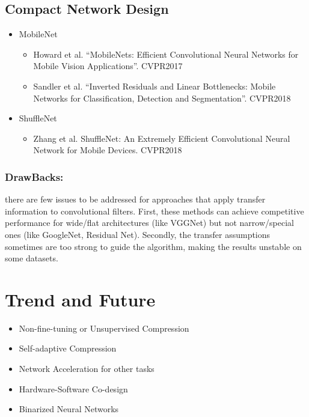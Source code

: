 \documentclass[a4paper]{article}
\begin{document}
		\subsection{Compact Network Design}
			\begin{itemize}
				\item MobileNet
					\begin{itemize}
						\item Howard et al. “MobileNets: Efficient Convolutional Neural Networks for
						Mobile Vision Applications”. CVPR2017
						\item Sandler et al. “Inverted Residuals and Linear Bottlenecks: Mobile Networks
						for Classification, Detection and Segmentation”. CVPR2018
					\end{itemize}
				\item ShuffleNet
					\begin{itemize}
						\item Zhang et al. ShuffleNet: An Extremely Efficient Convolutional Neural Network
						for Mobile Devices. CVPR2018
					\end{itemize}		
			\end{itemize}	
			\subsubsection{DrawBacks:}
			there are few issues to be addressed for
			approaches that apply transfer information to convolutional 
			filters. First, these methods can achieve competitive performance
			for wide/flat architectures (like VGGNet) but not
			narrow/special ones (like GoogleNet, Residual Net). Secondly,
			the transfer assumptions sometimes are too strong to guide the
			algorithm, making the results unstable on some datasets.		
	\section{Trend and Future}
	\begin{itemize}
		\item Non-fine-tuning or Unsupervised Compression
		\item Self-adaptive Compression
		\item Network Acceleration for other tasks
		\item Hardware-Software Co-design
		\item Binarized Neural Networks
	\end{itemize}
\end{document}

